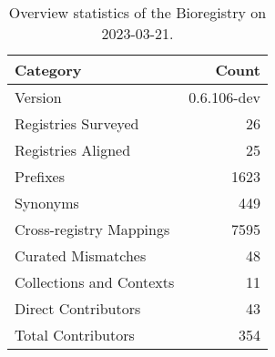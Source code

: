 \begin{table}
\centering
\caption{Overview statistics of the Bioregistry on 2023-03-21.}
\label{tab:bioregistry-summary}
\begin{tabular}{lr}
\toprule
                Category &       Count \\
\midrule
                 Version & 0.6.106-dev \\
     Registries Surveyed &          26 \\
      Registries Aligned &          25 \\
                Prefixes &        1623 \\
                Synonyms &         449 \\
 Cross-registry Mappings &        7595 \\
      Curated Mismatches &          48 \\
Collections and Contexts &          11 \\
     Direct Contributors &          43 \\
      Total Contributors &         354 \\
\bottomrule
\end{tabular}
\end{table}
